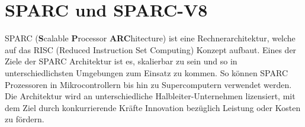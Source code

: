 









\section{SPARC und SPARC-V8}

SPARC (\textbf{S}calable \textbf{P}rocessor \textbf{ARC}hitecture) ist eine Rechnerarchitektur, welche auf das
RISC (Reduced Instruction Set Computing) Konzept aufbaut. Eines der Ziele der SPARC Architektur ist es, skalierbar
zu sein und so in unterschiedlichsten Umgebungen zum Einsatz zu kommen. So können SPARC Prozessoren in
Mikrocontrollern bis hin zu Supercomputern verwendet werden. Die Architektur wird an unterschiedliche
Halbleiter-Unternehmen lizensiert, mit dem Ziel durch konkurrierende Kräfte Innovation bezüglich Leistung oder
Kosten zu fördern.\cite{sparc}

